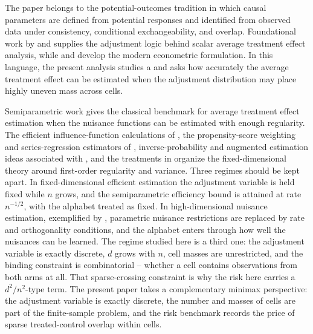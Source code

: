 \documentclass[11pt]{article}
\begin{document}
The paper belongs to the potential-outcomes tradition in which causal parameters are defined from potential responses and identified from observed data under consistency, conditional exchangeability, and overlap. Foundational work by \citet{Rubin1974,Rubin1979} and \citet{RosenbaumRubin1983} supplies the adjustment logic behind scalar average treatment effect analysis, while \citet{Imbens2009} and \citet{ImbensRubin2015} develop the modern econometric formulation. In this language, the present analysis studies a  and asks how accurately the average treatment effect can be estimated when the adjustment distribution may place highly uneven mass across cells.

Semiparametric work gives the classical benchmark for average treatment effect estimation when the nuisance functions can be estimated with enough regularity. The efficient influence-function calculations of \citet{Hahn1998}, the propensity-score weighting and series-regression estimators of \citet{Hirano2003}, inverse-probability and augmented estimation ideas associated with \citet{Robins1994}, and the treatments in \citet{VanderLaan2003,Tsiatis2006,VanderVaart1998} organize the fixed-dimensional theory around first-order regularity and variance. Three regimes should be kept apart. In fixed-dimensional efficient estimation the adjustment variable is held fixed while \(n\) grows, and the semiparametric efficiency bound is attained at rate \(n^{-1/2}\), with the alphabet treated as fixed. In high-dimensional nuisance estimation, exemplified by \citet{Belloni2017,Chernozhukov2018,Kennedy2022,Kennedy2023}, parametric nuisance restrictions are replaced by rate and orthogonality conditions, and the alphabet enters through how well the nuisances can be learned. The regime studied here is a third one: the adjustment variable is exactly discrete, \(d\) grows with \(n\), cell masses are unrestricted, and the binding constraint is combinatorial -- whether a cell contains observations from both arms at all. That sparse-crossing constraint is why the risk here carries a \(d^2/n^2\)-type term. The present paper takes a complementary minimax perspective: the adjustment variable is exactly discrete, the number and masses of cells are part of the finite-sample problem, and the risk benchmark records the price of sparse treated-control overlap within cells.
\end{document}
